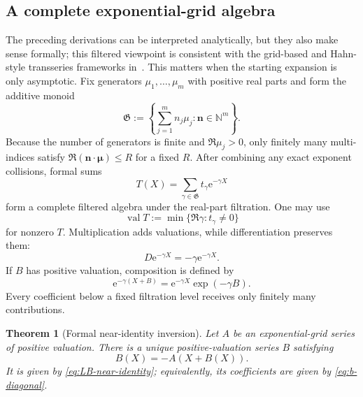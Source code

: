 \documentclass[11pt,oneside]{article}
\numberwithin{equation}{section}
\newtheorem{theorem}{Theorem}[section]
\newcommand{\val}{\operatorname{val}}
\newcommand{\e}{\mathrm{e}}
\newcommand{\NN}{\mathbb{N}}
\newcommand{\vct}[1]{\boldsymbol{#1}}
\begin{document}
\subsection{A complete exponential-grid algebra}

The preceding derivations can be interpreted analytically, but they also make
sense formally; this filtered viewpoint is consistent with the grid-based and Hahn-style transseries frameworks in~\cite{Edgar2010,vanderHoeven2006,ADH2017}.  This matters when the starting expansion is only asymptotic.
Fix generators \(\mu_1,\ldots,\mu_m\) with positive real parts and form the
additive monoid
\begin{equation}
  \mathfrak G:=\left\{\sum_{j=1}^m n_j\mu_j:\vct n\in\NN^m\right\}.
  \label{eq:exponent-monoid}
\end{equation}
Because the number of generators is finite and \(\Re\mu_j>0\), only finitely
many multi-indices satisfy \(\Re(\vct n\cdot\vct\mu)\le R\) for a fixed
\(R\).  After combining any exact exponent collisions, formal sums
\begin{equation}
  T(X)=\sum_{\gamma\in\mathfrak G}t_\gamma\e^{-\gamma X}
  \label{eq:grid-series}
\end{equation}
form a complete filtered algebra under the real-part filtration.  One may use
\begin{equation}
  \val T:=\min\{\Re\gamma:t_\gamma\ne0\}
  \label{eq:valuation}
\end{equation}
for nonzero \(T\).  Multiplication adds valuations, while differentiation
preserves them:
\begin{equation}
  D\e^{-\gamma X}=-\gamma\e^{-\gamma X}.
\end{equation}
If \(B\) has positive valuation, composition is defined by
\begin{equation}
  \e^{-\gamma(X+B)}=\e^{-\gamma X}\exp(-\gamma B).
  \label{eq:formal-composition}
\end{equation}
Every coefficient below a fixed filtration level receives only finitely many
contributions.

\begin{theorem}[Formal near-identity inversion]
\label{thm:formal-inversion}
Let \(A\) be an exponential-grid series of positive valuation.  There is a
unique positive-valuation series \(B\) satisfying
\begin{equation}
  B(X)=-A(X+B(X)).
  \label{eq:formal-fixed-point}
\end{equation}
It is given by \cref{eq:LB-near-identity}; equivalently, its coefficients are
given by \cref{eq:b-diagonal}.
\end{theorem}
\end{document}
